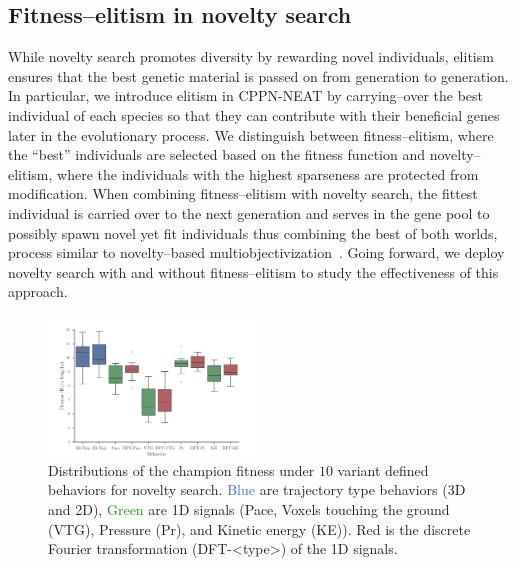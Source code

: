 \documentclass{sig-alternate}
\begin{document}
\subsection{Fitness--elitism in novelty search}
While novelty search promotes diversity by rewarding novel individuals, elitism ensures that the best genetic material is passed on from generation to generation.
In particular, we introduce elitism in CPPN-NEAT by carrying--over the best individual of each species so that they can contribute with their beneficial genes later in the evolutionary process. We distinguish between fitness--elitism, where the ``best'' individuals are selected based on the fitness function and novelty--elitism, where the individuals with the highest sparseness are protected from modification. When combining fitness--elitism with novelty search, the fittest individual is carried over to the next generation and serves in the gene pool to possibly spawn novel yet fit individuals thus combining the best of both worlds, process similar to novelty--based multiobjectivization~\cite{mouret2011novelty}. Going forward, we deploy novelty search with and without fitness--elitism to study the effectiveness of this approach.


\begin{figure}[t!]
\centering
\includegraphics[width=0.5\textwidth]{../Figures/Results/BehaviorPerformanceNoveltyOnly.pdf}
\caption{Distributions of the champion fitness under $10$ variant defined behaviors for novelty search. \textcolor{RoyalBlue}{Blue} are trajectory type behaviors (3D and 2D), \textcolor{ForestGreen}{Green} are 1D signals (Pace, Voxels touching the ground (VTG), Pressure (Pr), and Kinetic energy (KE)). \textcolor{BrickRed}{Red} is the discrete Fourier transformation (DFT-<type>) of the 1D signals.}
\label{fig:BehaviorsPerformance}
\end{figure}
\end{document}
